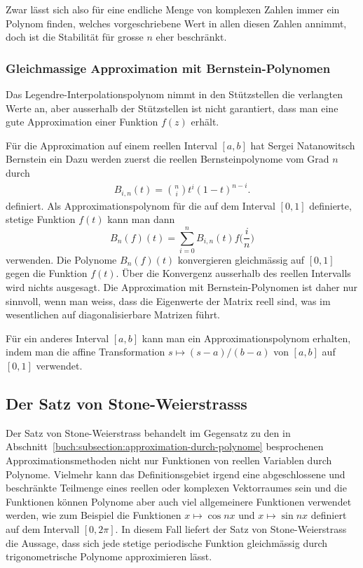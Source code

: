 Zwar lässt sich also für eine endliche Menge von komplexen Zahlen immer
ein Polynom finden, welches vorgeschriebene Wert in allen diesen Zahlen
annimmt, doch ist die Stabilität für grosse $n$ eher beschränkt.


\subsubsection{Gleichmassige Approximation mit Bernstein-Polynomen}
Das Legendre-Interpolationspolynom nimmt in den  Stützstellen die
verlangten Werte an, aber ausserhalb der Stützstellen ist nicht
garantiert, dass man eine gute Approximation einer Funktion $f(z)$
erhält.

Für die Approximation auf einem reellen Interval $[a,b]$ hat
Sergei Natanowitsch Bernstein ein 
Dazu werden zuerst die reellen Bernsteinpolynome vom Grad $n$
durch
\begin{align*}
B_{i,n}(t) = \binom{n}{i} t^i(1-t)^{n-i}.
\end{align*}
definiert.
Als Approximationspolynom für die auf dem Interval 
$[0,1]$ definierte, stetige Funktion $f(t)$ kann man dann
\[
B_n(f)(t)
=
\sum_{i=0}^n B_{i,n}(t) f\biggl(\frac{i}{n}\biggr)
\]
verwenden.
Die Polynome $B_n(f)(t)$ konvergieren gleichmässig auf $[0,1]$
gegen die Funktion $f(t)$.
Über die Konvergenz ausserhalb des reellen Intervalls wird nichts
ausgesagt.
Die Approximation mit Bernstein-Polynomen ist daher nur sinnvoll,
wenn man weiss, dass die Eigenwerte der Matrix reell sind, was im
wesentlichen auf diagonalisierbare Matrizen führt.

Für ein anderes Interval $[a,b]$ kann man ein Approximationspolynom
erhalten, indem man die affine Transformation
$s\mapsto (s-a)/(b-a)$
von $[a,b]$ auf $[0,1]$
verwendet. 

%
%
\subsection{Der Satz von Stone-Weierstrasss
\label{buch:subsetion:stone-weierstrass}}
Der Satz von Stone-Weierstrass behandelt im Gegensatz zu den in
Abschnitt~\ref{buch:subsection:approximation-durch-polynome}
besprochenen Approximationsmethoden nicht nur Funktionen von
reellen Variablen durch Polynome.
Vielmehr kann das Definitionsgebiet irgend eine abgeschlossene
und beschränkte Teilmenge eines reellen oder komplexen Vektorraumes
sein und die Funktionen können Polynome aber auch viel allgemeinere
Funktionen verwendet werden, wie zum Beispiel die Funktionen
$x\mapsto \cos nx$ und $x\mapsto \sin nx$ definiert auf dem
Intervall $[0,2\pi]$.
In diesem Fall liefert der Satz von Stone-Weierstrass die Aussage,
dass sich jede stetige periodische Funktion gleichmässig durch
trigonometrische Polynome approximieren lässt.

